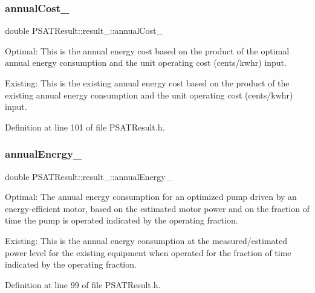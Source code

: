 \subsubsection{\texorpdfstring{annual\+Cost\+\_\+}{annualCost\_}}
{\footnotesize\ttfamily double P\+S\+A\+T\+Result\+::result\+\_\+\+::annual\+Cost\+\_\+}



Optimal\+: This is the annual energy cost based on the product of the optimal annual energy consumption and the unit operating cost (cents/kwhr) input. 

Existing\+: This is the existing annual energy cost based on the product of the existing annual energy consumption and the unit operating cost (cents/kwhr) input. 

Definition at line 101 of file P\+S\+A\+T\+Result.\+h.

\mbox{\label{struct_p_s_a_t_result_1_1result___acf5bcf6c5226d5e322239be520280ffc}} 
\subsubsection{\texorpdfstring{annual\+Energy\+\_\+}{annualEnergy\_}}
{\footnotesize\ttfamily double P\+S\+A\+T\+Result\+::result\+\_\+\+::annual\+Energy\+\_\+}



Optimal\+: The annual energy consumption for an optimized pump driven by an energy-\/efficient motor, based on the estimated motor power and on the fraction of time the pump is operated indicated by the operating fraction. 

Existing\+: This is the annual energy consumption at the measured/estimated power level for the existing equipment when operated for the fraction of time indicated by the operating fraction. 

Definition at line 99 of file P\+S\+A\+T\+Result.\+h.

\mbox{\label{struct_p_s_a_t_result_1_1result___acfdf51d60ae1007a94dcd46df3185c15}} 
